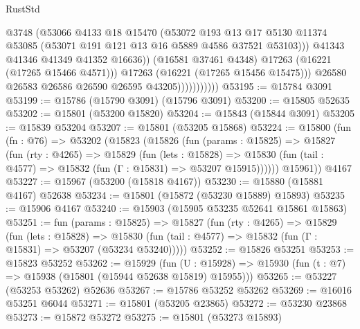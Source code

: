\begin{lexlean}{RustStd}
\begin{coremodule}
                                  @3748
                                  (@53066
                                    @4133
                                    @18
                                    @15470
                                    (@53072
                                      @193
                                      @13
                                      @17
                                      @5130
                                      @11374
                                      @53085
                                      (@53071 @191 @121 @13 @16 @5889 @4586 @37521 @53103)))
                                  @41343
                                  @41346
                                  @41349
                                  @41352
                                  @16636))
                              (@16581 @37461 @4348)
                              @17263
                              (@16221 (@17265 @15466 @4571)))
                            @17263
                            (@16221 (@17265 @15456 @15475)))
                          @26580
                          @26583
                          @26586
                          @26590
                          @26595
                          @43205)))))))))))
@53195 := @15784 @3091
@53199 := @15786 (@15790 @3091) (@15796 @3091)
@53200 := @15805 @52635
@53202 := @15801 (@53200 @15820)
@53204 := @15843 (@15844 @3091)
@53205 := @15839 @53204
@53207 := @15801 (@53205 @15868)
@53224 := @15800
    (fun (fn : @76) =>
    @53202
      (@15823
        (@15826
          (fun (params : @15825) =>
          @15827
            (fun (rty : @4265) =>
            @15829
              (fun (lets : @15828) =>
              @15830 (fun (tail : @4577) => @15832 (fun (Γ : @15831) => @53207 @15915))))))
        @15961))
    @4167
@53227 := @15967 (@53200 (@15818 @4167))
@53230 := @15880 (@15881 @4167) @52638
@53234 := @15801 (@15872 (@53230 @15889) @15893)
@53235 := @15906 @4167
@53240 := @15903 (@15905 @53235 @52641 @15861 @15863)
@53251 := fun (params : @15825) =>
  @15827
    (fun (rty : @4265) =>
    @15829
      (fun (lets : @15828) =>
      @15830 (fun (tail : @4577) => @15832 (fun (Γ : @15831) => @53207 (@53234 @53240)))))
@53252 := @15826 @53251
@53253 := @15823 @53252
@53262 := @15929
    (fun (U : @15928) => @15930 (fun (t : @7) => @15938 (@15801 (@15944 @52638 @15819) @15955)))
@53265 := @53227 (@53253 @53262) @52636
@53267 := @15786 @53252 @53262
@53269 := @16016 @53251 @6044
@53271 := @15801 (@53205 @23865)
@53272 := @53230 @23868
@53273 := @15872 @53272
@53275 := @15801 (@53273 @15893)

\end{coremodule}
\end{lexlean}
